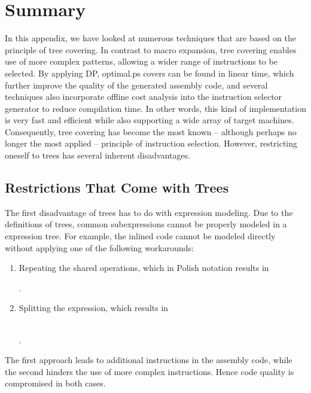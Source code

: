 {\section{Summary}

In this appendix, we have looked at numerous techniques that are based on the
\gls{principle} of \gls{tree covering}.
%
In contrast to \gls{macro expansion}, \gls{tree covering} enables use of more
complex \glspl{pattern}, allowing a wider range of \glspl{instruction} to be
selected.
%
By applying \glsdesc{DP}, \gls{optimal.ps} covers can be found in linear time,
which further improve the quality of the generated \gls{assembly code}, and
several techniques also incorporate \gls{offline cost analysis} into the
\gls{instruction selector} generator to reduce compilation time.
%
In other words, this kind of implementation is very fast and efficient while
also supporting a wide array of \glspl{target machine}.
%
Consequently, \gls{tree covering} has become the most known -- although perhaps
no longer the most applied -- \gls{principle} of \gls{instruction selection}.
%
However, restricting oneself to \glspl{tree} has several inherent disadvantages.


\subsection{Restrictions That Come with Trees}

%
%
%
%
The first disadvantage of \glspl{tree} has to do with expression modeling.
%
Due to the definitions of \glspl{tree}, common subexpressions cannot be properly
modeled in a \gls{expression tree}.
%
For example, the inlined code cannot be modeled directly without applying one of
the following workarounds:
%
\begin{enumerate}
  \item Repeating the shared operations, which in \gls{Polish notation} results
    in
    \begin{center}
      .
    \end{center}
  \item Splitting the expression, which results in
    \begin{center}
      \\
      .
    \end{center}
\end{enumerate}
%
The first approach leads to additional \glspl{instruction} in the \gls{assembly
  code}, while the second hinders the use of more complex \glspl{instruction}.
%
Hence code quality is compromised in both cases.

}
